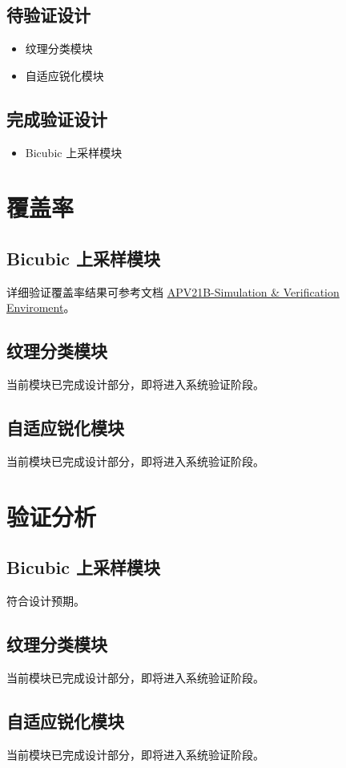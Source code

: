 \documentclass[12pt, a4paper, oneside]{ctexbook}
\begin{document}
		\section{待验证设计}
			\begin{itemize}
				\item 纹理分类模块
    			\item 自适应锐化模块
			\end{itemize}

		\section{完成验证设计}
			\begin{itemize}
				\item Bicubic 上采样模块
			\end{itemize}
	\chapter{覆盖率}
	\section{Bicubic 上采样模块}
	详细验证覆盖率结果可参考文档 \href{./ref/APV21B_Simulation_Verification_Enviroment.pdf}{APV21B-Simulation \& Verification Enviroment}。
	\section{纹理分类模块}
	当前模块已完成设计部分，即将进入系统验证阶段。	
	\section{自适应锐化模块}
	当前模块已完成设计部分，即将进入系统验证阶段。
	\chapter{验证分析}
	\section{Bicubic 上采样模块}
	符合设计预期。
	\section{纹理分类模块}
	当前模块已完成设计部分，即将进入系统验证阶段。
	\section{自适应锐化模块}
	当前模块已完成设计部分，即将进入系统验证阶段。
\end{document}
